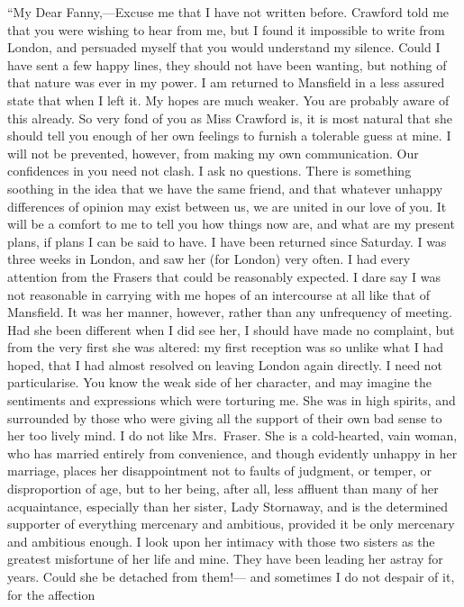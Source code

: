 \documentclass{article}
\begin{document}
``My Dear Fanny,---Excuse me that I have not written before.
Crawford told me that you were wishing to hear from me,
but I found it impossible to write from London,
and persuaded myself that you would understand my silence.
Could I have sent a few happy lines, they should not
have been wanting, but nothing of that nature was ever
in my power.  I am returned to Mansfield in a less assured
state that when I left it.  My hopes are much weaker.
You are probably aware of this already.  So very fond of you
as Miss Crawford is, it is most natural that she should tell
you enough of her own feelings to furnish a tolerable guess
at mine.  I will not be prevented, however, from making my
own communication.  Our confidences in you need not clash.
I ask no questions.  There is something soothing in the
idea that we have the same friend, and that whatever
unhappy differences of opinion may exist between us,
we are united in our love of you.  It will be a comfort
to me to tell you how things now are, and what are my
present plans, if plans I can be said to have.  I have been
returned since Saturday.  I was three weeks in London,
and saw her (for London) very often.  I had every attention
from the Frasers that could be reasonably expected.
I dare say I was not reasonable in carrying with me
hopes of an intercourse at all like that of Mansfield.
It was her manner, however, rather than any unfrequency
of meeting.  Had she been different when I did see her,
I should have made no complaint, but from the very first
she was altered:  my first reception was so unlike
what I had hoped, that I had almost resolved on leaving
London again directly.  I need not particularise.
You know the weak side of her character, and may imagine
the sentiments and expressions which were torturing me.
She was in high spirits, and surrounded by those who
were giving all the support of their own bad sense
to her too lively mind.  I do not like Mrs.\ Fraser.
She is a cold-hearted, vain woman, who has married entirely
from convenience, and though evidently unhappy in her marriage,
places her disappointment not to faults of judgment,
or temper, or disproportion of age, but to her being,
after all, less affluent than many of her acquaintance,
especially than her sister, Lady Stornaway, and is the
determined supporter of everything mercenary and ambitious,
provided it be only mercenary and ambitious enough.  I look
upon her intimacy with those two sisters as the greatest
misfortune of her life and mine.  They have been leading
her astray for years.  Could she be detached from them!---%
and sometimes I do not despair of it, for the affection
\end{document}
